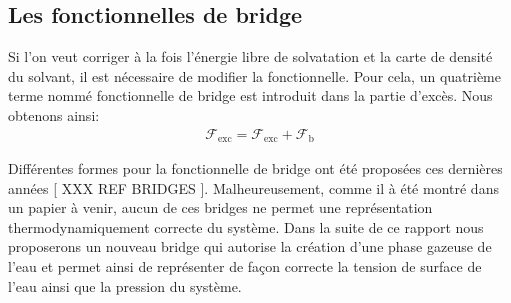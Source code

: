 


\subsection{Les fonctionnelles de bridge}
Si l'on veut corriger à la fois l'énergie libre de solvatation et la carte de densité du solvant, il est nécessaire de modifier la fonctionnelle. Pour cela, un quatrième terme nommé fonctionnelle de bridge est introduit dans la partie d'excès. Nous obtenons ainsi:
\begin{eqnarray}
\mathcal{F}_\mathrm{exc} = \mathcal{F}_\mathrm{exc} + \mathcal{F}_\mathrm{b}
\end{eqnarray}

Différentes formes pour la fonctionnelle de bridge ont été proposées ces dernières années [ XXX REF BRIDGES ]. Malheureusement, comme il à été montré dans un papier à venir, aucun de ces bridges ne permet une représentation thermodynamiquement correcte du système. Dans la suite de ce rapport nous proposerons un nouveau bridge qui autorise la création d'une phase gazeuse de l'eau et permet ainsi de représenter de façon correcte la tension de surface de l'eau ainsi que la pression du système.





